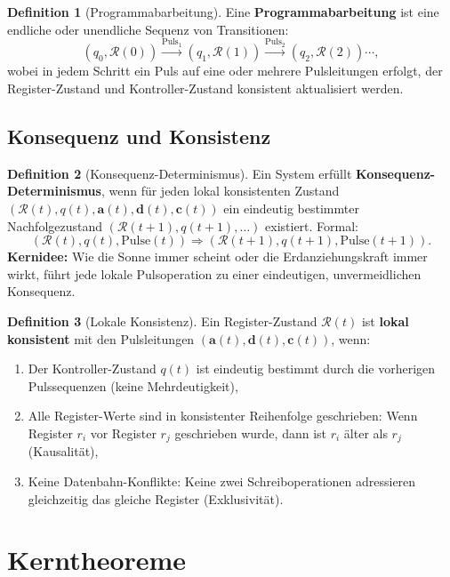 \documentclass[a4paper,12pt]{article}
\theoremstyle{definition}
\newtheorem{definition}{Definition}
\begin{document}
\begin{definition}[Programmabarbeitung]
	Eine \textbf{Programmabarbeitung} ist eine endliche oder unendliche Sequenz von Transitionen:
	\[
	(q_0, \mathcal{R}(0)) \xrightarrow{\text{Puls}_{1}} (q_1, \mathcal{R}(1)) \xrightarrow{\text{Puls}_{2}} (q_2, \mathcal{R}(2)) \cdots,
	\]
	wobei in jedem Schritt ein Puls auf eine oder mehrere Pulsleitungen erfolgt, der Register-Zustand und Kontroller-Zustand konsistent aktualisiert werden.
\end{definition}

\subsection{Konsequenz und Konsistenz}

\begin{definition}[Konsequenz-Determinismus]
	Ein System erfüllt \textbf{Konsequenz-Determinismus}, wenn für jeden lokal konsistenten Zustand $(\mathcal{R}(t), q(t), \mathbf{a}(t), \mathbf{d}(t), \mathbf{c}(t))$ ein eindeutig bestimmter Nachfolgezustand $(\mathcal{R}(t+1), q(t+1), \ldots)$ existiert. Formal:
	\[
	(\mathcal{R}(t), q(t), \text{Pulse}(t)) \Rightarrow (\mathcal{R}(t+1), q(t+1), \text{Pulse}(t+1)).
	\]
	\textbf{Kernidee:} Wie die Sonne immer scheint oder die Erdanziehungskraft immer wirkt, führt jede lokale Pulsoperation zu einer eindeutigen, unvermeidlichen Konsequenz.
\end{definition}

\begin{definition}[Lokale Konsistenz]
	Ein Register-Zustand $\mathcal{R}(t)$ ist \textbf{lokal konsistent} mit den Pulsleitungen $(\mathbf{a}(t), \mathbf{d}(t), \mathbf{c}(t))$, wenn:
	\begin{enumerate}
		\item Der Kontroller-Zustand $q(t)$ ist eindeutig bestimmt durch die vorherigen Pulssequenzen (keine Mehrdeutigkeit),
		\item Alle Register-Werte sind in konsistenter Reihenfolge geschrieben: Wenn Register $r_i$ vor Register $r_j$ geschrieben wurde, dann ist $r_i$ älter als $r_j$ (Kausalität),
		\item Keine Datenbahn-Konflikte: Keine zwei Schreiboperationen adressieren gleichzeitig das gleiche Register (Exklusivität).
	\end{enumerate}
\end{definition}

\section{Kerntheoreme}
\end{document}
